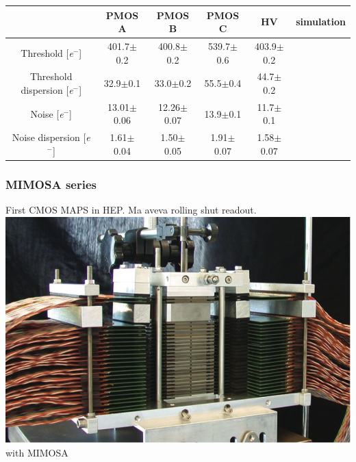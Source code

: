 \begin{frame}
\begin{columns}
        \end{columns}                  
        \begin{table}[h!]
            \tiny
            \begin{center}
            \begin{tabular}{| c |  c | c | c |c || c|}
            \hline
            & PMOS A & PMOS B & PMOS C & HV & simulation \\
            \hline
            \hline
            Threshold [\si{\elementarycharge}$^-$] & 401.7$\pm$0.2 & 400.8$\pm$0.2 & 539.7$\pm$0.6 &  403.9$\pm$0.2 &\\
            Threshold dispersion [\si{\elementarycharge}$^-$] & 32.9$\pm$0.1 & 33.0$\pm$0.2 & 55.5$\pm$0.4 & 44.7$\pm$0.2 &\\
            Noise [\si{\elementarycharge}$^-$] & 13.01$\pm$0.06 & 12.26$\pm$0.07 & 13.9$\pm$0.1 & 11.7$\pm$0.1 & \\
            Noise dispersion [\si{\elementarycharge}$^-$] & 1.61$\pm$0.04 & 1.50$\pm$0.05 & 1.91$\pm$0.07 & 1.58$\pm$0.07 & \\
            \hline
            \end{tabular}
            \end{center}
        \end{table}       

    \end{frame}

    \begin{frame}
        \frametitle{MIMOSA series}
        First CMOS MAPS in HEP. Ma aveva rolling shut readout. 
        \includegraphics[width=.45\linewidth]{figures/pixel_detectors_usage/ALICE_FoCAL.png} with MIMOSA
    \end{frame} 


